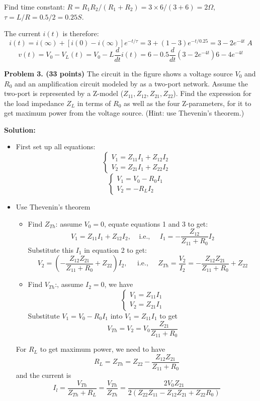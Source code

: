 Find time constant: $R=R_1R_2/(R_1+R_2)=3\times 6/(3+6)=2\Omega$,
$\tau=L/R=0.5/2=0.25S$. 

The current $i(t)$ is therefore:
\[ i(t)=i(\infty)+[i(0)-i(\infty)]e^{-t/\tau}=3+(1-3)e^{-t/0.25}
	=3-2e^{-4t} \;A \]
\[ v(t)=V_0-V_L(t)=V_0-L\frac{d}{dt}i(t)=6-0.5 \frac{d}{dt}(3-2e^{-4t})
	6-4e^{-4t} \]


\item {\bf Problem 3. (33 points)} 
The circuit in the figure shows a voltage source $V_0$ and $R_0$ and an
amplification circuit modeled by as a two-port network. Assume the two-port 
is represented by a Z-model ($Z_{11}, Z_{12}, Z_{21}, Z_{22}$). Find the 
expression for the load impedance $Z_L$ in terms of $R_0$ as well as the
four Z-parameters, for it to get maximum power from the voltage source.
(Hint: use Thevenin's theorem.)

{\bf Solution:} 
\begin{itemize}
\item First set up all equations:
\[ \left\{ \begin{array}{l} V_1=Z_{11}I_1+Z_{12}I_2 \\
	V_2=Z_{21}I_1+Z_{22}I_2 \end{array} \right.	\]
\[ \left\{ \begin{array}{l} V_1=V_0-R_0I_1 \\
	V_2=-R_L I_2 \end{array} \right.	\]
\item Use Thevenin's theorem

\begin{itemize}
\item Find $Z_{Th}$: assume $V_0=0$, equate equations 1 and 3 to get:
\[ V_1=Z_{11}I_1+Z_{12}I_2, \;\;\;\;\mbox{i.e.,}\;\;\;\;\;
I_1=-\frac{Z_{12}}{Z_{11}+R_0} I_2 \]
Substitute this $I_1$ in equation 2 to get:
\[ V_2=(-\frac{Z_{12}Z_{21}}{Z_{11}+R_0}+Z_{22}) I_2,\;\;\;\;\;
\mbox{i.e.,}\;\;\;\;\;
Z_{Th}=\frac{V_2}{I_2}=-\frac{Z_{12}Z_{21}}{Z_{11}+R_0}+Z_{22}	\]
\item Find $V_{Th}$:, assume $I_2=0$, we have
\[ \left\{\begin{array}{l} V_1=Z_{11}I_1 \\V_2=Z_{21}I_1\end{array}\right. \]
Substitute $V_1=V_0-R_0I_1$ into $V_1=Z_{11}I_1$ to get
\[	V_{Th}=V_2=V_0\frac{Z_{21}}{Z_{11}+R_0}	\]
\end{itemize}

For $R_L$ to get maximum power, we need to have
\[ R_L=Z_{Th}=Z_{22}-\frac{Z_{12}Z_{21}}{Z_{11}+R_0}	\]
and the current is
\[ I_l=\frac{V_{Th}}{Z_{Th}+R_L}=\frac{V_{Th}}{Z_{Th}}
	=\frac{2V_0Z_{21}}{2(Z_{22}Z_{11}-Z_{12}Z_{21}+Z_{22}R_0)} \]


\end{itemize}


